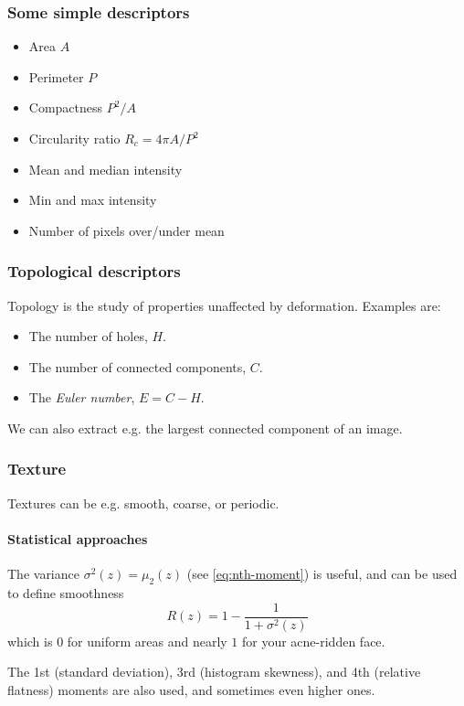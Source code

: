 \subsubsection{Some simple descriptors}
\begin{itemize}
    \item Area $A$
    \item Perimeter $P$
    \item Compactness $P^2 / A$
    \item Circularity ratio $R_c = 4 \pi A / P^2$
    \item Mean and median intensity
    \item Min and max intensity
    \item Number of pixels over/under mean
\end{itemize}

\subsubsection{Topological descriptors}
Topology is the study of properties unaffected by deformation. Examples are:
\begin{itemize}
    \item The number of holes, $H$.
    \item The number of connected components, $C$.
    \item The \emph{Euler number}, $E = C - H$.
\end{itemize}
We can also extract e.g. the largest connected component of an image.

\subsubsection{Texture}
Textures can be e.g. smooth, coarse, or periodic.

\paragraph{Statistical approaches}
The variance $\sigma^2(z) = \mu_2(z)$ (see \eqref{eq:nth-moment}) is useful, and can be used to define smoothness
\begin{equation}
    R(z) = 1 - \frac{1}{1 + \sigma^2(z)}
\end{equation}
which is $0$ for uniform areas and nearly $1$ for your acne-ridden face.

The 1st (standard deviation), 3rd (histogram skewness), and 4th (relative flatness) moments are also used, and sometimes even higher ones.

